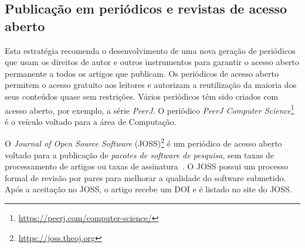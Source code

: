 
\subsection*{Publicação em periódicos e revistas de acesso aberto} 

Esta estratégia recomenda o desenvolvimento de uma nova geração de periódicos que usam os direitos de autor e outros instrumentos para garantir o acesso aberto permanente a todos os artigos que publicam. Os periódicos de acesso aberto permitem o acesso gratuito aos leitores e autorizam a reutilização da maioria dos seus conteúdos quase sem restrições.
%
Vários periódicos têm sido criados com acesso aberto, por exemplo, a série \textit{PeerJ}. %
O periódico \textit{PeerJ Computer Science}\footnote{\url{https://peerj.com/computer-science/}} é o veículo voltado para a área de Computação.

O \textit{Journal of Open Source Software} (JOSS)\footnote{\url{https://joss.theoj.org}}
é um periódico de acesso aberto voltado para a publicação de \textit{pacotes de software de pesquisa}, sem taxas de processamento de artigos ou taxas de assinatura~\cite{joss:2017}.
O JOSS possui um processo formal de revisão por pares para melhorar a qualidade do software submetido. Após a aceitação no JOSS, o artigo recebe um DOI e é listado no site do JOSS.


%
%

